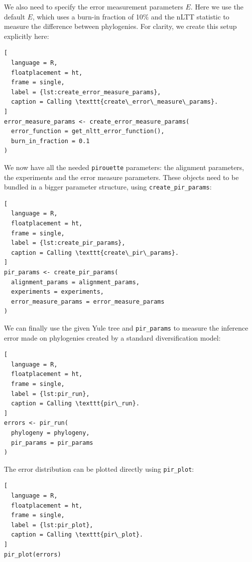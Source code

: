 We also need to specify the error measurement parameters $\mathit{E}$.
Here we use the default $\mathit{E}$, which uses a burn-in fraction 
of 10\% and the nLTT statistic to
measure the difference between phylogenies. For clarity,
we create this setup explicitly here:

\begin{lstlisting}[
  language = R,
  floatplacement = ht,
  frame = single,
  label = {lst:create_error_measure_params},
  caption = Calling \texttt{create\_error\_measure\_params}.
]
error_measure_params <- create_error_measure_params(
  error_function = get_nltt_error_function(),
  burn_in_fraction = 0.1
)
\end{lstlisting}

We now have all the needed \verb;pirouette; parameters: the alignment 
parameters, the experiments and the error measure parameters.
These objects need to be bundled in a bigger parameter structure, 
using \verb;create_pir_params;:

\begin{lstlisting}[
  language = R,
  floatplacement = ht,
  frame = single,
  label = {lst:create_pir_params},
  caption = Calling \texttt{create\_pir\_params}.
]
pir_params <- create_pir_params(
  alignment_params = alignment_params,
  experiments = experiments,
  error_measure_params = error_measure_params
)
\end{lstlisting}

We can finally use the given Yule tree and \verb;pir_params; to measure the 
inference error made on phylogenies
created by a standard diversification model:

\begin{lstlisting}[
  language = R,
  floatplacement = ht,
  frame = single,
  label = {lst:pir_run},
  caption = Calling \texttt{pir\_run}.
]
errors <- pir_run(
  phylogeny = phylogeny,
  pir_params = pir_params
)
\end{lstlisting}

The error distribution can be plotted directly using \verb;pir_plot;:

\begin{lstlisting}[
  language = R,
  floatplacement = ht,
  frame = single,
  label = {lst:pir_plot},
  caption = Calling \texttt{pir\_plot}.
]
pir_plot(errors)
\end{lstlisting}


